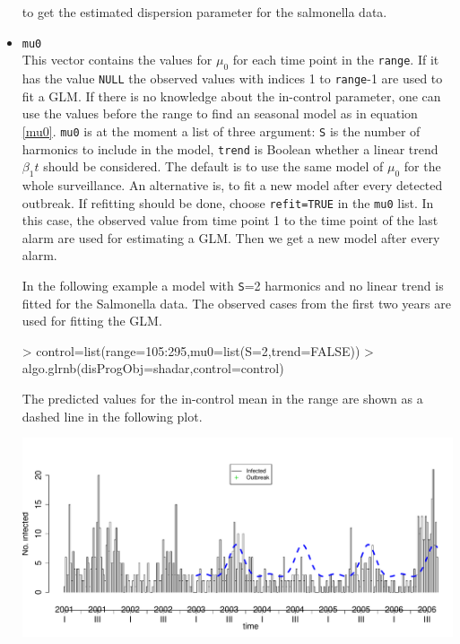 \documentclass[a4paper,11pt]{article}
\begin{document}
\begin{itemize}
to get the estimated dispersion parameter for the salmonella data.

\item \verb+mu0+ \\
This vector contains the values for $\mu_0$ for each time point in the \verb+range+. If it has the value \verb+NULL+  the observed values with indices 1 to \verb+range+-1 are used to fit a GLM. If there is no knowledge about the in-control parameter, one can use the values before the range to find an seasonal model as in equation \ref{mu0}. \verb+mu0+ is at the moment a list of three argument: \verb+S+ is the number of harmonics to include in the model, \verb+trend+ is Boolean whether a linear trend $\beta_1t$ should be considered. The default is to use the same model of $\mu_0$ for the whole surveillance. An alternative is, to fit a new model after every detected outbreak. If refitting should be done, choose \verb+refit=TRUE+ in the \verb+mu0+ list. In this case, the observed value from time point 1 to the time point of the last alarm are used for estimating a GLM. Then we get a new model after every alarm. 


In the following example a model with \verb+S+=2 harmonics and no linear trend is fitted for the Salmonella data. The observed cases from the first two years are used for fitting the GLM. 
   
\begin{Schunk}
\begin{Sinput}
> control=list(range=105:295,mu0=list(S=2,trend=FALSE))
> algo.glrnb(disProgObj=shadar,control=control)
\end{Sinput}
\end{Schunk}


The predicted values for the in-control mean in the range are shown as a dashed line in the following plot.

\begin{Schunk}
\end{Schunk}
\includegraphics{figs/vignette_glrnb-012}



\end{itemize}
\end{document}
